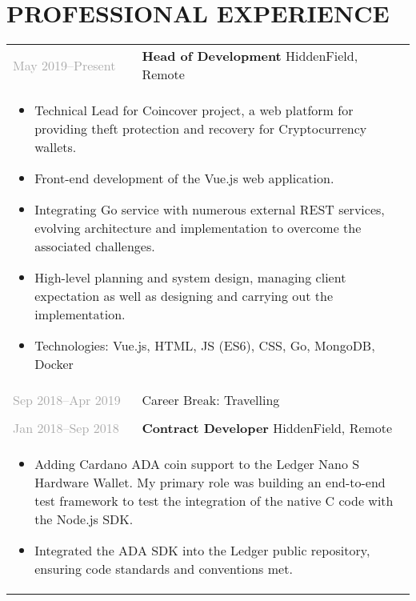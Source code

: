 \documentclass{article}
\newenvironment{exptable}{
  \begin{longtable}{lp{0.8\textwidth}}
  }{
  \end{longtable}
}
\begin{document}
  \section*{PROFESSIONAL EXPERIENCE}
    \begin{exptable}
      \textcolor{darkgray}{May 2019--Present}  & \textbf{Head of Development} HiddenField, Remote \\
      \multicolumn{2}{p{\textwidth}}{
        \begin{itemize}
          \item Technical Lead for Coincover project, a web platform for providing theft protection and recovery for Cryptocurrency wallets.
          \item Front-end development of the Vue.js web application.
          \item Integrating Go service with numerous external REST services, evolving architecture and implementation to overcome the associated challenges.
          \item High-level planning and system design, managing client expectation as well as designing and carrying out the implementation.
        \end{itemize}

        \vspace{1em}

        \begin{itemize}[leftmargin=1em]
          \item[] Technologies: Vue.js, HTML, JS (ES6), CSS, Go, MongoDB, Docker
        \end{itemize}
      } \\

      \textcolor{darkgray}{Sep 2018--Apr 2019} & Career Break: Travelling \\
      \multicolumn{2}{p{\textwidth}}{} \\

      \textcolor{darkgray}{Jan 2018--Sep 2018} & \textbf{Contract Developer} HiddenField, Remote \\
      \multicolumn{2}{p{\textwidth}}{
        \begin{itemize}
          \item Adding Cardano ADA coin support to the Ledger Nano S Hardware Wallet. My primary role was building an end-to-end test framework to test the integration of the native C code with the Node.js SDK.
          \item Integrated the ADA SDK into the Ledger public repository, ensuring code standards and conventions met.
        \end{itemize}

}
\end{exptable}
\end{document}
